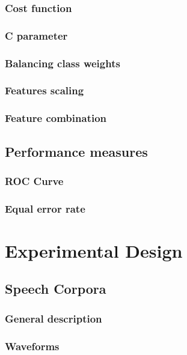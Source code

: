 \documentclass[11pt,a4paper]{tesis}
\begin{document}
		\subsection{Cost function}
			
		\subsection{C parameter}
			
		\subsection{Balancing class weights}
			
		\subsection{Features scaling}
			
		\subsection{Feature combination}
			
	\section{Performance measures}
		\subsection{ROC Curve}
			
		\subsection{Equal error rate}
			
\chapter{Experimental Design}
	\section{Speech Corpora}
		\subsection{General description}
			
		\subsection{Waveforms}
			
\end{document}
